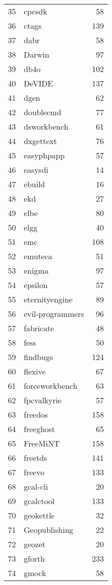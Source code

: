 \begin{table}[ht]
\begin{tabular}{rlr}
  35 & cpcsdk &  58 \\ 
  36 & ctags & 139 \\ 
  37 & dabr &  58 \\ 
  38 & Darwin &  97 \\ 
  39 & db4o & 102 \\ 
  40 & DeVIDE & 137 \\ 
  41 & dgen &  62 \\ 
  42 & doublecmd &  77 \\ 
  43 & dsworkbench &  61 \\ 
  44 & dxgettext &  76 \\ 
  45 & easyphpapp &  57 \\ 
  46 & easysdi &  14 \\ 
  47 & ebuild &  16 \\ 
  48 & ekd &  27 \\ 
  49 & elbe &  80 \\ 
  50 & elgg &  40 \\ 
  51 & emc & 108 \\ 
  52 & emuteca &  51 \\ 
  53 & enigma &  97 \\ 
  54 & epsilon &  57 \\ 
  55 & eternityengine &  89 \\ 
  56 & evil-programmers &  96 \\ 
  57 & fabricate &  48 \\ 
  58 & fess &  50 \\ 
  59 & findbugs & 124 \\ 
  60 & flexive &  67 \\ 
  61 & forceworkbench &  63 \\ 
  62 & fpcvalkyrie &  57 \\ 
  63 & freedos & 158 \\ 
  64 & freeghost &  65 \\ 
  65 & FreeMiNT & 158 \\ 
  66 & freetds & 141 \\ 
  67 & freevo & 133 \\ 
  68 & gcal-cli &  20 \\ 
  69 & gcalctool & 133 \\ 
  70 & geokettle &  32 \\ 
  71 & Geopublishing &  22 \\ 
  72 & geozet &  20 \\ 
  73 & gforth & 233 \\ 
  74 & gmock &  58 \\ 

\end{tabular}
\end{table}
